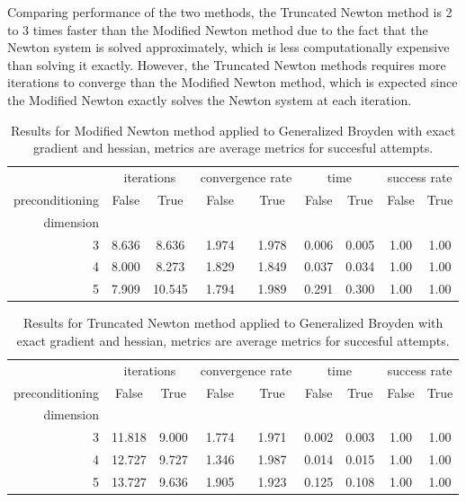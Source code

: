 Comparing performance of the two methods, the Truncated Newton method is 2 to 3 times faster than the Modified Newton method due to the fact that the Newton system is solved approximately, which is less computationally expensive than solving it exactly.
However, the Truncated Newton methods requires more iterations to converge than the Modified Newton method, which is expected since the Modified Newton exactly solves the Newton system at each iteration.

\begin{table}
\centering
\caption{Results for Modified Newton method applied to Generalized Broyden with exact gradient and hessian, metrics are average metrics for succesful attempts.}
\label{tab:Modified_Newton_Generalized_Broyden_exact}
\begin{tabular}{r|cc|cc|cc|cc}
\toprule
    & \multicolumn{2}{|c}{iterations} & \multicolumn{2}{|c}{convergence rate} & \multicolumn{2}{|c}{time} & \multicolumn{2}{|c}{success rate} \\
preconditioning & False & True & False & True & False & True & False & True \\
dimension &  &  &  &  &  &  &  &  \\
\midrule
3 & 8.636 & 8.636 & 1.974 & 1.978 & 0.006 & 0.005 & 1.00 & 1.00 \\
4 & 8.000 & 8.273 & 1.829 & 1.849 & 0.037 & 0.034 & 1.00 & 1.00 \\
5 & 7.909 & 10.545 & 1.794 & 1.989 & 0.291 & 0.300 & 1.00 & 1.00 \\
\bottomrule
\end{tabular}
\end{table}

\begin{table}
\centering
\caption{Results for Truncated Newton method applied to Generalized Broyden with exact gradient and hessian, metrics are average metrics for succesful attempts.}
\label{tab:Truncated_Newton_Generalized_Broyden_exact}
\begin{tabular}{r|cc|cc|cc|cc}
\toprule
    & \multicolumn{2}{|c}{iterations} & \multicolumn{2}{|c}{convergence rate} & \multicolumn{2}{|c}{time} & \multicolumn{2}{|c}{success rate} \\
preconditioning & False & True & False & True & False & True & False & True \\
dimension &  &  &  &  &  &  &  &  \\
\midrule
3 & 11.818 & 9.000 & 1.774 & 1.971 & 0.002 & 0.003 & 1.00 & 1.00 \\
4 & 12.727 & 9.727 & 1.346 & 1.987 & 0.014 & 0.015 & 1.00 & 1.00 \\
5 & 13.727 & 9.636 & 1.905 & 1.923 & 0.125 & 0.108 & 1.00 & 1.00 \\
\bottomrule
\end{tabular}
\end{table}

